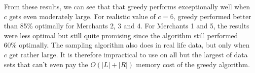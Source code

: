 From these results, we can see that that greedy performs exceptionally well when $c$ gets even moderately large.
For realistic value of $c=6$, greedy performed better than 85\% optimally for Merchants 2, 3 and 4. For Merchants
1 and 5, the results were less optimal but still quite promising since the algorithm still performed 60\% optimally.
The sampling algorithm also does in real life data, but only when $c$ get rather large. It is therefore impractical
to use on all but the largest of data sets that can't even pay the $O(|L|+|R|)$ memory cost of the greedy algorithm.